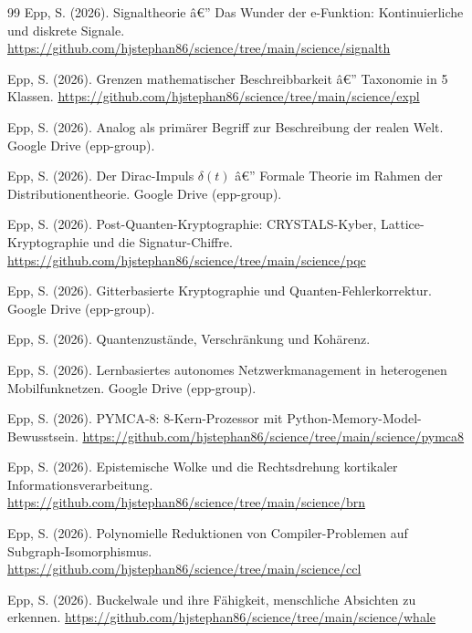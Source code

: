 ﻿\documentclass[a4paper,12pt]{article}
\theoremstyle{definition}
\begin{document}
\begin{thebibliography}{99}
Epp, S. (2026).
Signaltheorie â€” Das Wunder der e-Funktion: Kontinuierliche und diskrete Signale. \url{https://github.com/hjstephan86/science/tree/main/science/signalth}

Epp, S. (2026).
Grenzen mathematischer Beschreibbarkeit â€” Taxonomie in 5 Klassen. \url{https://github.com/hjstephan86/science/tree/main/science/expl}

Epp, S. (2026).
Analog als primärer Begriff zur Beschreibung der realen Welt.
Google Drive (epp-group).

Epp, S. (2026).
Der Dirac-Impuls $\delta(t)$ â€” Formale Theorie im Rahmen der Distributionentheorie.
Google Drive (epp-group).

Epp, S. (2026).
Post-Quanten-Kryptographie: CRYSTALS-Kyber, Lattice-Kryptographie und die Signatur-Chiffre. \url{https://github.com/hjstephan86/science/tree/main/science/pqc}

Epp, S. (2026).
Gitterbasierte Kryptographie und Quanten-Fehlerkorrektur.
Google Drive (epp-group).

Epp, S. (2026).
Quantenzustände, Verschränkung und Kohärenz.

Epp, S. (2026).
Lernbasiertes autonomes Netzwerkmanagement in heterogenen Mobilfunknetzen.
Google Drive (epp-group).

Epp, S. (2026).
PYMCA-8: 8-Kern-Prozessor mit Python-Memory-Model-Bewusstsein. \url{https://github.com/hjstephan86/science/tree/main/science/pymca8}

Epp, S. (2026).
Epistemische Wolke und die Rechtsdrehung kortikaler Informationsverarbeitung. \url{https://github.com/hjstephan86/science/tree/main/science/brn}

Epp, S. (2026).
Polynomielle Reduktionen von Compiler-Problemen auf Subgraph-Isomorphismus. \url{https://github.com/hjstephan86/science/tree/main/science/ccl}

Epp, S. (2026).
Buckelwale und ihre Fähigkeit, menschliche Absichten zu erkennen. \url{https://github.com/hjstephan86/science/tree/main/science/whale}

\end{thebibliography}
\end{document}
